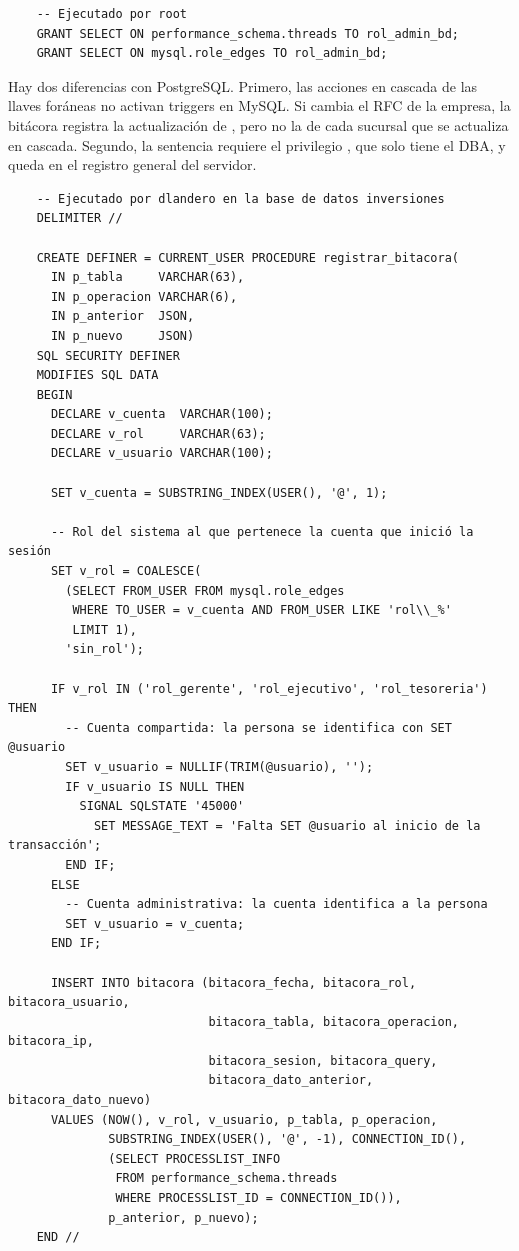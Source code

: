 \begin{verbatim}
	-- Ejecutado por root
	GRANT SELECT ON performance_schema.threads TO rol_admin_bd;
	GRANT SELECT ON mysql.role_edges TO rol_admin_bd;
\end{verbatim}

Hay dos diferencias con PostgreSQL. Primero, las acciones en cascada de las llaves foráneas no activan triggers en MySQL. Si cambia el RFC de la empresa, la bitácora registra la actualización de , pero no la de cada sucursal que se actualiza en cascada. Segundo, la sentencia  requiere el privilegio , que solo tiene el DBA, y queda en el registro general del servidor.

\begin{verbatim}
	-- Ejecutado por dlandero en la base de datos inversiones
	DELIMITER //

	CREATE DEFINER = CURRENT_USER PROCEDURE registrar_bitacora(
	  IN p_tabla     VARCHAR(63),
	  IN p_operacion VARCHAR(6),
	  IN p_anterior  JSON,
	  IN p_nuevo     JSON)
	SQL SECURITY DEFINER
	MODIFIES SQL DATA
	BEGIN
	  DECLARE v_cuenta  VARCHAR(100);
	  DECLARE v_rol     VARCHAR(63);
	  DECLARE v_usuario VARCHAR(100);

	  SET v_cuenta = SUBSTRING_INDEX(USER(), '@', 1);

	  -- Rol del sistema al que pertenece la cuenta que inició la sesión
	  SET v_rol = COALESCE(
	    (SELECT FROM_USER FROM mysql.role_edges
	     WHERE TO_USER = v_cuenta AND FROM_USER LIKE 'rol\\_%'
	     LIMIT 1),
	    'sin_rol');

	  IF v_rol IN ('rol_gerente', 'rol_ejecutivo', 'rol_tesoreria') THEN
	    -- Cuenta compartida: la persona se identifica con SET @usuario
	    SET v_usuario = NULLIF(TRIM(@usuario), '');
	    IF v_usuario IS NULL THEN
	      SIGNAL SQLSTATE '45000'
	        SET MESSAGE_TEXT = 'Falta SET @usuario al inicio de la transacción';
	    END IF;
	  ELSE
	    -- Cuenta administrativa: la cuenta identifica a la persona
	    SET v_usuario = v_cuenta;
	  END IF;

	  INSERT INTO bitacora (bitacora_fecha, bitacora_rol, bitacora_usuario,
	                        bitacora_tabla, bitacora_operacion, bitacora_ip,
	                        bitacora_sesion, bitacora_query,
	                        bitacora_dato_anterior, bitacora_dato_nuevo)
	  VALUES (NOW(), v_rol, v_usuario, p_tabla, p_operacion,
	          SUBSTRING_INDEX(USER(), '@', -1), CONNECTION_ID(),
	          (SELECT PROCESSLIST_INFO
	           FROM performance_schema.threads
	           WHERE PROCESSLIST_ID = CONNECTION_ID()),
	          p_anterior, p_nuevo);
	END //


\end{verbatim}
